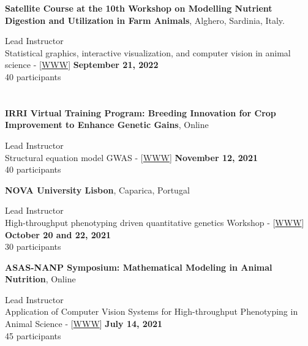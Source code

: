 \documentclass[margin,line,10pt]{res}
\begin{document}
\begin{resume}
{\bf Satellite Course at the 10th Workshop on Modelling Nutrient Digestion and Utilization in Farm Animals}, Alghero, Sardinia, Italy. 
\vspace{.01pt}

Lead Instructor  \\
Statistical graphics, interactive visualization, and computer vision in animal science - [\textcolor{blue}{\href{http://morotalab.org/MODNUT2022/MODNUT2022.html}{WWW}}] 
 \hfill {\bf September 21, 2022}  \\
40 participants



\section{}


{\bf IRRI Virtual Training Program: Breeding Innovation for Crop Improvement to Enhance Genetic Gains}, Online
\vspace{.01pt}

Lead Instructor  \\
Structural equation model GWAS - [\textcolor{blue}{\href{http://morotalab.org/IRRI2021/day1/day1.html}{WWW}}]
\hfill {\bf November 12, 2021} \\
40 participants



{\bf NOVA University Lisbon}, Caparica, Portugal
\vspace{.01pt}

Lead Instructor  \\
High-throughput phenotyping driven quantitative genetics Workshop - [\textcolor{blue}{\href{http://morotalab.org/CMA-FCT-NOVA2021/CMA-FCT-NOVA2021.html}{WWW}}]
\hfill {\bf October 20 and 22, 2021} \\
30 participants



{\bf ASAS-NANP Symposium: Mathematical Modeling in Animal Nutrition}, Online
\vspace{.01pt}

Lead Instructor  \\
Application of Computer Vision Systems for High-throughput Phenotyping in Animal Science - [\textcolor{blue}{\href{http://morotalab.org/guestlectures/2020/NANP/handson/PreASAS.pdf}{WWW}}]
\hfill {\bf July 14, 2021} \\
45 participants




\section{}


\end{resume}
\end{document}
